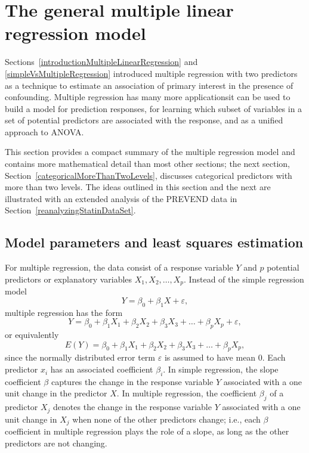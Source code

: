  
 \section{The general multiple linear regression model}
 \label{generalMultipleRegression}
 
Sections~\ref{introductionMultipleLinearRegression} and \ref{simpleVsMultipleRegression} introduced multiple regression with two predictors as a technique to estimate an association of primary interest in the presence of confounding.  Multiple regression has many more applications\textemdash it can be used to build a model for prediction responses, for learning which subset of variables in a set of potential predictors are associated with the response, and as a unified approach to ANOVA.

This section provides a compact summary of the multiple regression model and contains more mathematical detail than most other sections; the next section, Section~\ref{categoricalMoreThanTwoLevels}, discusses categorical predictors with more than two levels. The ideas outlined in this section and the next are illustrated with an extended analysis of the PREVEND data in Section~\ref{reanalyzingStatinDataSet}. 
 
\subsection{Model parameters and least squares estimation}
 
For multiple regression, the data consist of a response variable $Y$ and $p$ potential predictors or explanatory variables $X_1, X_2,\ldots, X_p$.   Instead of the simple regression model 
 $${Y} = \beta_{0} + \beta_{1}X + {\varepsilon},$$
 multiple regression has the form
 $${Y} = \beta_{0} +
     \beta_{1}X_{1} + \beta_{2}X_{2} + \beta_{3}X_{3} + \dots +
     \beta_{p}X_{p} + \varepsilon,$$
or equivalently
 $$E(Y) = \beta_{0} + 
     \beta_{1}X_{1} + \beta_{2}X_{2} + \beta_{3}X_{3} + \dots +
     \beta_{p}X_{p},
	 \label{multipleRegressionModel}
	 $$ 
since the normally distributed error term $\varepsilon$ is assumed to have mean 0. Each predictor $x_i$ has an associated coefficient $\beta_i$.  In simple regression, the slope coefficient $\beta$ captures the change in the response variable $Y$ associated with a one unit change in the predictor $X$.  In multiple regression, the coefficient $\beta_j$ of a predictor $X_j$ denotes the change in the response variable $Y$ associated with a one unit change in $X_j$ when none of the other predictors change; i.e., each $\beta$ coefficient in multiple regression plays the role of a slope, as long as the other predictors are not changing.

